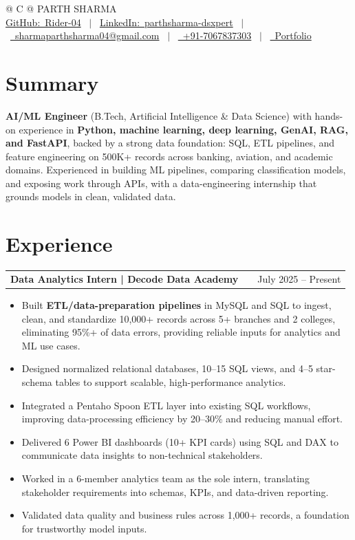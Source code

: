 \documentclass[a4paper,10pt]{article}
\makeatletter
\newcommand{\faGithub}{GitHub:}\newcommand{\faLinkedin}{LinkedIn:}\newcommand{\faEnvelope}{}%
\newcommand{\faMobile}{}\newcommand{\faGlobe}{}}
\newenvironment{joblong}[2]
    {
    \begin{tabularx}{\linewidth}{@{}l X r@{}}
    \textbf{#1} & \hfill &  #2 \\[2pt]
    \end{tabularx}
    \begin{minipage}[t]{\linewidth}
    \begin{itemize}[nosep,after=\strut, leftmargin=1em, itemsep=1pt,label=--]
    }
    {
    \end{itemize}
    \end{minipage}
    }
\makeatother
\begin{document}
\pagestyle{empty}

\begin{tabularx}{\linewidth}{@{} C @{}}
\Huge{PARTH SHARMA} \\[5pt]
\href{https://github.com/Rider-04}{\raisebox{-0.05\height}\faGithub\ Rider-04} \ $|$ \
\href{https://www.linkedin.com/in/parthsharma-dsxpert}{\raisebox{-0.05\height}\faLinkedin\ parthsharma-dsxpert} \ $|$ \
\href{mailto:sharmaparthsharma04@gmail.com}{\raisebox{-0.05\height}\faEnvelope \ sharmaparthsharma04@gmail.com} \ $|$ \
\href{tel:+917067837303}{\raisebox{-0.05\height}\faMobile \ +91-7067837303} \ $|$ \
\href{https://parth-portfolio-virid.vercel.app/}{\raisebox{-0.05\height}\faGlobe \ Portfolio}
\end{tabularx}

\section{Summary}
\textbf{AI/ML Engineer} (B.Tech, Artificial Intelligence \& Data Science) with hands-on experience in \textbf{Python, machine learning, deep learning, GenAI, RAG, and FastAPI}, backed by a strong data foundation: SQL, ETL pipelines, and feature engineering on 500K+ records across banking, aviation, and academic domains. Experienced in building ML pipelines, comparing classification models, and exposing work through APIs, with a data-engineering internship that grounds models in clean, validated data.

\section{Experience}
\begin{joblong}{Data Analytics Intern | Decode Data Academy}{July 2025 -- Present}
\item Built \textbf{ETL/data-preparation pipelines} in MySQL and SQL to ingest, clean, and standardize 10,000+ records across 5+ branches and 2 colleges, eliminating 95\%+ of data errors, providing reliable inputs for analytics and ML use cases.
\item Designed normalized relational databases, 10--15 SQL views, and 4--5 star-schema tables to support scalable, high-performance analytics.
\item Integrated a Pentaho Spoon ETL layer into existing SQL workflows, improving data-processing efficiency by 20--30\% and reducing manual effort.
\item Delivered 6 Power BI dashboards (10+ KPI cards) using SQL and DAX to communicate data insights to non-technical stakeholders.
\item Worked in a 6-member analytics team as the sole intern, translating stakeholder requirements into schemas, KPIs, and data-driven reporting.
\item Validated data quality and business rules across 1,000+ records, a foundation for trustworthy model inputs.
\end{joblong}
\end{document}
